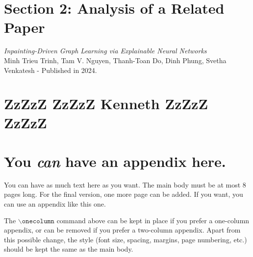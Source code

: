 \documentclass{article}
\theoremstyle{plain}
\theoremstyle{definition}
\theoremstyle{remark}
\begin{document}
\setcounter{section}{0}
\section*{Section 2: Analysis of a Related Paper}

\textit{Inpainting-Driven Graph Learning via Explainable Neural Networks}
\\Minh Trieu Trinh, Tam V. Nguyen, Thanh-Toan Do, Dinh Phung, Svetha Venkatesh - Published in 2024.


\section{ZzZzZ ZzZzZ Kenneth ZzZzZ ZzZzZ}






\newpage




\newpage
\appendix
\onecolumn
\section{You \emph{can} have an appendix here.}

You can have as much text here as you want. The main body must be at most $8$ pages long.
For the final version, one more page can be added.
If you want, you can use an appendix like this one.  

The $\mathtt{\backslash onecolumn}$ command above can be kept in place if you prefer a one-column appendix, or can be removed if you prefer a two-column appendix.  Apart from this possible change, the style (font size, spacing, margins, page numbering, etc.) should be kept the same as the main body.
\end{document}

